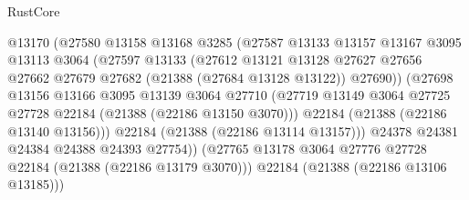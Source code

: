 \begin{lexlean}{RustCore}
\begin{coremodule}
                                @13170
                                (@27580
                                  @13158
                                  @13168
                                  @3285
                                  (@27587
                                    @13133
                                    @13157
                                    @13167
                                    @3095
                                    @13113
                                    @3064
                                    (@27597
                                      @13133
                                      (@27612
                                        @13121
                                        @13128
                                        @27627
                                        @27656
                                        @27662
                                        @27679
                                        @27682
                                        (@21388 (@27684 @13128 @13122))
                                        @27690))
                                    (@27698
                                      @13156
                                      @13166
                                      @3095
                                      @13139
                                      @3064
                                      @27710
                                      (@27719
                                        @13149
                                        @3064
                                        @27725
                                        @27728
                                        @22184
                                        (@21388 (@22186 @13150 @3070)))
                                      @22184
                                      (@21388 (@22186 @13140 @13156)))
                                    @22184
                                    (@21388 (@22186 @13114 @13157)))
                                  @24378
                                  @24381
                                  @24384
                                  @24388
                                  @24393
                                  @27754))
                              (@27765
                                @13178
                                @3064
                                @27776
                                @27728
                                @22184
                                (@21388 (@22186 @13179 @3070)))
                              @22184
                              (@21388 (@22186 @13106 @13185)))

\end{coremodule}
\end{lexlean}
